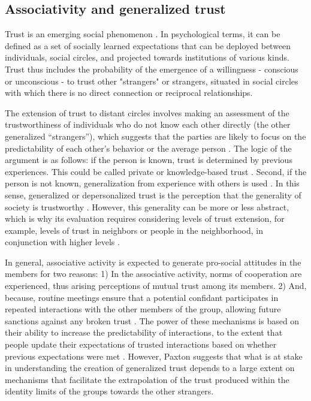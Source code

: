 \bigskip



\subsection{Associativity and generalized trust}

Trust is an emerging social phenomenon \parencite{kuwabara_cohesion_2011,tilly_confianza_2010}. In psychological terms, it can be defined as a set of socially learned expectations \parencite{barber_logic_1983} that can be deployed between individuals, social circles, and projected towards institutions of various kinds. Trust thus includes the probability of the emergence of a willingness - conscious or unconscious - to trust other "strangers" or strangers, situated in social circles with which there is no direct connection or reciprocal relationships.
\bigskip

The extension of trust to distant circles involves making an assessment of the trustworthiness of individuals who do not know each other directly (the other generalized “strangers”), which suggests that the parties are likely to focus on the predictability of each other's behavior or the average person \parencite{glanville_why_2016,paxton_association_2007,paxton_is_2015}. The logic of the argument is as follows: if the person is known, trust is determined by previous experiences. This could be called private or knowledge-based trust \parencite{yamagishi_trust_1994,stolle_clubs_2001}. Second, if the person is not known, generalization from experience with others is used \parencite{hardin_conceptions_2001}. In this sense, generalized or depersonalized trust is the perception that the generality of society is trustworthy \parencite{glanville_social_2013,paxton_social_2002,paxton_association_2007}. However, this generality can be more or less abstract, which is why its evaluation requires considering levels of trust extension, for example, levels of trust in neighbors or people in the neighborhood, in conjunction with higher levels \parencite{glanville_why_2016}.
\bigskip

In general, associative activity is expected to generate pro-social attitudes in the members for two reasons: 1) In the associative activity, norms of cooperation are experienced, thus arising perceptions of mutual trust among its members. 2) And, because, routine meetings ensure that a potential confidant participates in repeated interactions with the other members of the group, allowing future sanctions against any broken trust \parencite{axelrod_evolution_1984,paxton_trust_2018}. The power of these mechanisms is based on their ability to increase the predictability of interactions, to the extent that people update their expectations of trusted interactions based on whether previous expectations were met \parencite{paxton_trust_2018}. However, Paxton \citeyear{paxton_association_2007} suggests that what is at stake in understanding the creation of generalized trust depends to a large extent on mechanisms that facilitate the extrapolation of the trust produced within the identity limits of the groups towards the other strangers. 
\bigskip

